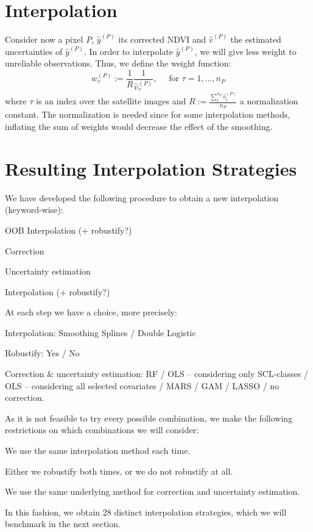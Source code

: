 \section{Interpolation}{
    \label{sec:corr_link}
    Consider now a pixel $P$, $\hat y^{(P)}$ its corrected NDVI and $\hat v^{(P)}$ the estimated uncertainties of $\hat y^{(P)}$. In order to interpolate $\hat y^{(P)}$, we will give less weight to unreliable observations. Thus, we define the weight function: 
    \begin{equation}
        \label{eq:corr_link}
        w^{(P)}_\tau:=\frac{1}{R} \frac{1}{\hat v^{(P)}_\tau}, 
        \quad \text{ for } \tau=1,\dots, n_P
    \end{equation}  
    where $\tau$ is an index over the satellite images and $R:=\frac{\sum_i^{n_P}\hat v^{(P)}_i}{n_P}$ a normalization constant. The normalization is needed since for some interpolation methods, inflating the sum of weights would decrease the effect of the smoothing. 
}


\section{Resulting Interpolation Strategies}{
    \label{sec:corr_itpl_stat}
    We have developed the following procedure to obtain a new interpolation (keyword-wise):
    \begin{Nenumerate}
        \item OOB Interpolation (+ robustify?)
        \item Correction 
        \item Uncertainty estimation
        \item Interpolation (+ robustify?)
    \end{Nenumerate}
    At each step we have a choice, more precisely:
    \begin{Nitemize}
        \item Interpolation: Smoothing Splines / Double Logistic
        \item Robustify: Yes / No
        \item Correction \& uncertainty estimation: RF / OLS -- considering only SCL-classes / OLS -- considering all selected covariates / MARS / GAM / LASSO / no correction.
    \end{Nitemize}
    As it is not feasible to try every possible combination, we make the following restrictions on which combinations we will consider:
    \begin{Nitemize}
        \item We use the same interpolation method each time.
        \item Either we robustify both times, or we do not robustify at all.
        \item We use the same underlying method for correction and uncertainty estimation.
    \end{Nitemize}

    In this fashion, we obtain 28 distinct interpolation strategies, which we will benchmark in the next section.
}

